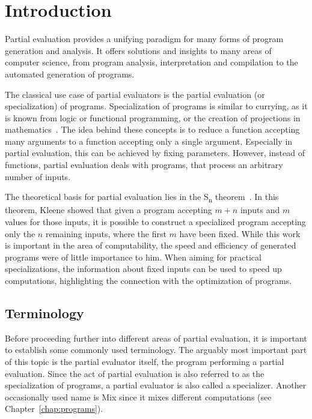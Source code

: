 
\newcommand{\smn}[0]{S\rlap{\textsuperscript{m}}\textsubscript{n}{ }}

\section{Introduction}\label{sec:introduction}

Partial evaluation provides a unifying paradigm for many forms of program generation and analysis.
It offers solutions and insights to many areas of computer science, from program analysis, interpretation and compilation to the automated generation of programs.

The classical use case of partial evaluators is the partial evaluation (or specialization) of programs.
Specialization of programs is similar to currying, as it is known from logic or functional programming, or the creation of projections in mathematics~\cite{Jones_PartialEvaluation}.
The idea behind these concepts is to reduce a function accepting many arguments to a function accepting only a single argument.
Especially in partial evaluation, this can be achieved by fixing parameters.
However, instead of functions, partial evaluation deals with programs, that process an arbitrary number of inputs.

The theoretical basis for partial evaluation lies in the \smn{} theorem~\cite{Kleene_GeneralRecursiveFunctions}.
In this theorem, Kleene showed that given a program accepting $m + n$ inputs and $m$ values for those inputs, it is possible to construct a specialized program accepting only the $n$ remaining inputs, where the first $m$ have been fixed.
While this work is important in the area of computability, the speed and efficiency of generated programs were of little importance to him.
When aiming for practical specializations, the information about fixed inputs can be used to speed up computations, highlighting the connection with the optimization of programs.


\subsection{Terminology}

Before proceeding further into different areas of partial evaluation, it is important to establish some commonly used terminology.
The arguably most important part of this topic is the partial evaluator itself, the program performing a partial evaluation.
Since the act of partial evaluation is also referred to as the specialization of programs, a partial evaluator is also called a specializer.
Another occasionally used name is Mix since it mixes different computations (see Chapter~\ref{chap:programs}).

